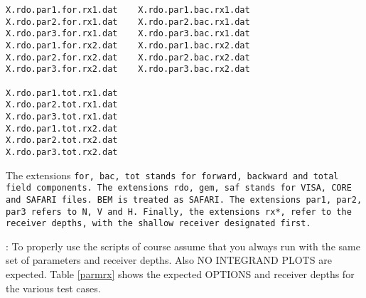 \begin{verbatim}
X.rdo.par1.for.rx1.dat    X.rdo.par1.bac.rx1.dat
X.rdo.par2.for.rx1.dat    X.rdo.par2.bac.rx1.dat
X.rdo.par3.for.rx1.dat    X.rdo.par3.bac.rx1.dat
X.rdo.par1.for.rx2.dat    X.rdo.par1.bac.rx2.dat
X.rdo.par2.for.rx2.dat    X.rdo.par2.bac.rx2.dat
X.rdo.par3.for.rx2.dat    X.rdo.par3.bac.rx2.dat

X.rdo.par1.tot.rx1.dat
X.rdo.par2.tot.rx1.dat
X.rdo.par3.tot.rx1.dat
X.rdo.par1.tot.rx2.dat
X.rdo.par2.tot.rx2.dat
X.rdo.par3.tot.rx2.dat
\end{verbatim}

The extensions \tt for, bac, tot \rm stands for
forward, backward and total field components. The extensions 
\tt rdo, gem, saf \rm stands for VISA, CORE and SAFARI files. 
BEM is treated as SAFARI. The extensions \tt par1, par2, par3 \rm 
refers to N, V and H. Finally, the extensions \tt rx*\rm, refer 
to the receiver depths, with the shallow receiver designated first.

 : To properly use the scripts of course assume that
          you always run with the same set of parameters
          and receiver depths. Also NO INTEGRAND PLOTS are
          expected. Table \ref{parmrx} shows the expected OPTIONS 
	  and receiver depths for the various test cases.

